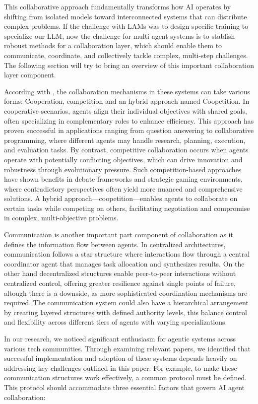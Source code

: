 \documentclass[journal,twoside,10pt]{IEEEtran}
\begin{document}
This collaborative approach fundamentally transforms how AI operates by shifting from isolated models toward interconnected systems that can distribute complex problems. If the challenge with LAMs  was to design specific training to specialize our LLM, now the challenge for multi agent systems is to stablish roboust methods for a collaboration layer, which should enable them to communicate, coordinate, and collectively tackle complex, multi-step challenges. The following section will try to bring an overview of this important collaboration layer component.

According with \cite{tran2025multiagent}, the collaboration mechanisms in these systems can take various forms: Cooperation, competition and an hybrid approach named Coopetition. In cooperative scenarios, agents align their individual objectives with shared goals, often specializing in complementary roles to enhance efficiency. This approach has proven successful in applications ranging from question answering to collaborative programming, where different agents may handle research, planning, execution, and evaluation tasks. By contrast, competitive collaboration occurs when agents operate with potentially conflicting objectives, which can drive innovation and robustness through evolutionary pressure. Such competition-based approaches have shown benefits in debate frameworks and strategic gaming environments, where contradictory perspectives often yield more nuanced and comprehensive solutions. A hybrid approach—coopetition—enables agents to collaborate on certain tasks while competing on others, facilitating negotiation and compromise in complex, multi-objective problems.

Communication is another important part component of collaboration as it defines the information flow between agents. In centralized architectures, communication follows a star structure  where interactions flow through a central coordinator agent that manages task allocation and synthesizes results. On the other hand decentralized structures enable peer-to-peer interactions without centralized control, offering greater resilience against single points of failure, altough there is a downside, as more sophisticated coordination mechanisms are required. The communication system could also have a hierarchical arrangement by creating layered structures with defined authority levels, this balance control and flexibility across different tiers of agents with varying specializations.

In our research, we noticed significant enthusiasm for agentic systems across various tech communities. Through examining relevant papers, we identified that successful implementation and adoption of these systems depends heavily on addressing key challenges outlined in this paper. For example, to make these communication structures work effectively, a common protocol must be defined. This protocol should accommodate three essential factors that govern AI agent collaboration:
\end{document}
